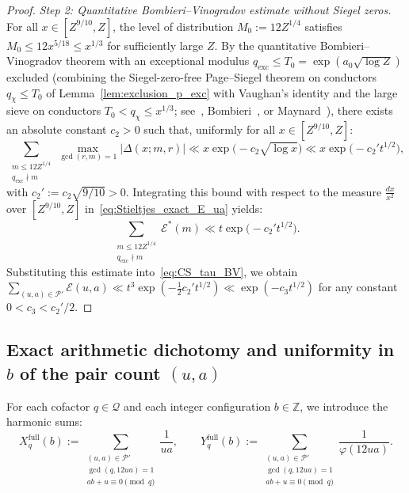 \documentclass[11pt, a4paper]{article}
\theoremstyle{plain}
\theoremstyle{definition}
\newcommand{\Z}{\mathbb{Z}}
\begin{document}
\begin{proof}
\medskip\noindent\emph{Step 2: Quantitative Bombieri--Vinogradov estimate without Siegel zeros.}
For all $x \in [Z^{9/10}, Z]$, the level of distribution $M_0 := 12Z^{1/4}$ satisfies $M_0 \le 12 x^{5/18} \le x^{1/3}$ for sufficiently large $Z$. By the quantitative Bombieri--Vinogradov theorem with an exceptional modulus $q_{\mathrm{exc}} \le T_0 = \exp(a_0\sqrt{\log Z})$ excluded (combining the Siegel-zero-free Page--Siegel theorem on conductors $q_\chi \le T_0$ of Lemma~\ref{lem:exclusion_p_exc} with Vaughan's identity and the large sieve on conductors $T_0 < q_\chi \le x^{1/3}$; see~\cite[Chaps.~24 and~28]{davenport}, Bombieri~\cite[Thm.~17]{bombieri}, or Maynard~\cite[Prop.~9.2]{maynard2016}), there exists an absolute constant $c_2 > 0$ such that, uniformly for all $x \in [Z^{9/10}, Z]$:
\[
\sum_{\substack{m \le 12Z^{1/4} \\ q_{\mathrm{exc}} \nmid m}} \max_{\gcd(r,m)=1} |\Delta(x; m, r)| \ll x \exp\!\big(-c_2 \sqrt{\log x}\big) \ll x \exp\!\big(-c_2' t^{1/2}\big),
\]
with $c_2' := c_2 \sqrt{9/10} > 0$. Integrating this bound with respect to the measure $\frac{dx}{x^2}$ over $[Z^{9/10}, Z]$ in~\eqref{eq:Stieltjes_exact_E_ua} yields:
\[
\sum_{\substack{m \le 12Z^{1/4} \\ q_{\mathrm{exc}} \nmid m}} \mathcal{E}^{\ast}(m) \ll t \exp\!\big(-c_2' t^{1/2}\big).
\]
Substituting this estimate into~\eqref{eq:CS_tau_BV}, we obtain $\sum_{(u,a) \in \mathcal{P}'} \mathcal{E}(u,a) \ll t^3$\linebreak $\exp(-\frac{1}{2} c_2' t^{1/2}) \ll \exp(-c_3 t^{1/2})$ for any constant $0 < c_3 < c_2'/2$.
\end{proof}

\subsection{Exact arithmetic dichotomy and uniformity in $b$ of the pair count $(u,a)$}\label{subsec:dichotomie_b}
For each cofactor $q \in \mathcal{Q}$ and each integer configuration $b \in \Z$, we introduce the harmonic sums:
\begin{equation}\label{eq:def_Xq_Yq}
X_q^{\mathrm{full}}(b) := \sum_{\substack{(u,a) \in \mathcal{P}' \\ \gcd(q, 12ua)=1 \\ ab+u \equiv 0 \pmod q}} \frac{1}{ua}, \qquad Y_q^{\mathrm{full}}(b) := \sum_{\substack{(u,a) \in \mathcal{P}' \\ \gcd(q, 12ua)=1 \\ ab+u \equiv 0 \pmod q}} \frac{1}{\varphi(12ua)}.
\end{equation}
\end{document}
